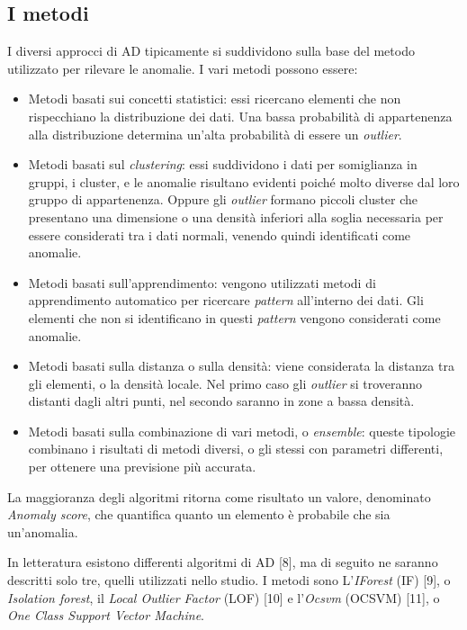 \subsection{I metodi}
I diversi approcci di AD tipicamente si suddividono sulla base del metodo utilizzato per
rilevare le anomalie. I vari metodi possono essere:
\begin{itemize}
	\item{Metodi basati sui concetti statistici: essi ricercano elementi che non rispecchiano la
		distribuzione dei dati. Una bassa probabilità di appartenenza alla distribuzione
		determina un'alta probabilità di essere un \textit{outlier}.}
	\item{Metodi basati sul \textit{clustering}: essi suddividono i dati per somiglianza in gruppi, i
		cluster, e le anomalie risultano evidenti poiché molto diverse dal loro gruppo di
		appartenenza. Oppure gli \textit{outlier} formano piccoli cluster che presentano una
		dimensione o una densità inferiori alla soglia necessaria per essere considerati tra i
		dati normali, venendo quindi identificati come anomalie.}
	\item{Metodi basati sull’apprendimento: vengono utilizzati metodi di apprendimento
		automatico per ricercare \textit{pattern} all’interno dei dati. Gli elementi che non si
		identificano in questi \textit{pattern} vengono considerati come anomalie.}
	\item{Metodi basati sulla distanza o sulla densità: viene considerata la distanza tra gli
		elementi, o la densità locale. Nel primo caso gli \textit{outlier} si troveranno distanti dagli
		altri punti, nel secondo saranno in zone a bassa densità.}
	\item{Metodi basati sulla combinazione di vari metodi, o \textit{ensemble}: queste tipologie
		combinano i risultati di metodi diversi, o gli stessi con parametri differenti, per
		ottenere una previsione più accurata.}
\end{itemize}	
La maggioranza degli algoritmi ritorna come risultato un valore, denominato \textit{Anomaly score},
che quantifica quanto un elemento è probabile che sia un’anomalia.

In letteratura esistono differenti algoritmi di AD [8], ma di seguito ne saranno descritti solo
tre, quelli utilizzati nello studio. I metodi sono L’\textit{IForest} (IF) [9], o \textit{Isolation forest}, il \textit{Local Outlier Factor} (LOF) [10] e l’\textit{Ocsvm} (OCSVM) [11], o \textit{One Class Support Vector Machine}.

